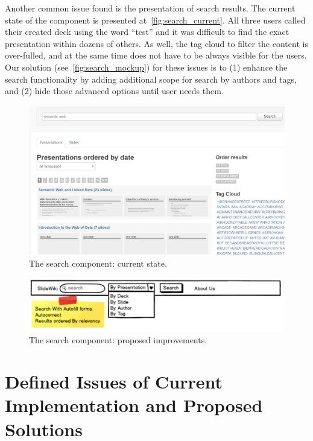 \documentclass[PhD, Submit, ngerman,UKenglish,table]{scrbook}
\begin{document}
Another common issue found is the presentation of search results.
The current state of the component is presented at~\autoref{fig:search_current}.
All three users called their created deck using the word ``test'' and it was difficult to find the exact presentation within dozens of others.
As well, the tag cloud to filter the content is over-fulled, and at the same time does not have to be always visible for the users.
Our solution (see~\autoref{fig:search_mockup}) for these issues is to (1) enhance the search functionality by adding additional scope for search by authors and tags, and (2) hide those advanced options until user needs them. 


\begin{figure}[ht!]
	\centering
		\includegraphics[width=\columnwidth]{images/search.png}
	\caption{The search component: current state.}
	\label{fig:search_current}
\end{figure}

\begin{figure}[ht!]
	\centering
		\includegraphics[width=\columnwidth]{images/search_mockup.png}
	\caption{The search component: proposed improvements.}
	\label{fig:search_mockup}
\end{figure}



\section{Defined Issues of Current Implementation and Proposed Solutions}
\label{sec:SlideWiki_new_generation}
\end{document}
